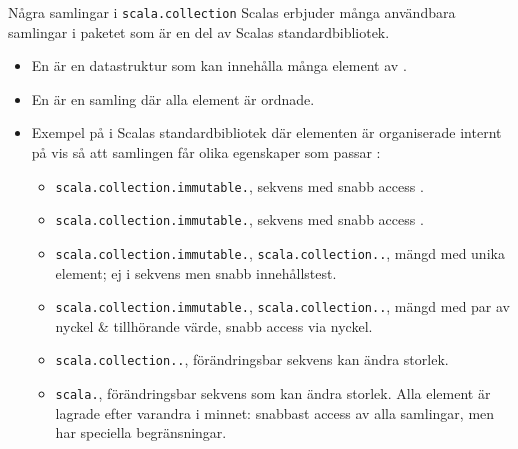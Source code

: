 \begin{Slide}{Några samlingar i \texttt{scala.collection}}\SlideFontSmall
\ifkompendium Scalas erbjuder många användbara samlingar i paketet  som är en del av Scalas standardbibliotek.\fi
\SlideOnly{\setlength{\leftmargini}{0pt}}
\begin{itemize}
\item En   är en datastruktur som kan innehålla många element av .
\item En   är en samling där alla element är ordnade.

\item Exempel på  i Scalas standardbibliotek där elementen är organiserade  internt på  vis så att samlingen får olika egenskaper som passar :
\begin{itemize}\SlideFontTiny
\item \texttt{scala.collection.immutable.}, sekvens med snabb access .
\item \texttt{scala.collection.immutable.}, sekvens med snabb access .
\item \texttt{scala.collection.immutable.}, \texttt{scala.collection..}, mängd med unika element; ej i sekvens men snabb innehållstest.
\item \texttt{scala.collection.immutable.}, \texttt{scala.collection..}, mängd med par av nyckel \& tillhörande värde, snabb access via nyckel.
\item \texttt{scala.collection..}, förändringsbar sekvens kan ändra storlek.
\item \texttt{scala.}, förändringsbar sekvens som  kan ändra storlek. Alla element är lagrade efter varandra i minnet: snabbast access av alla samlingar, men har speciella begränsningar.
\end{itemize}
\end{itemize}
\end{Slide}


